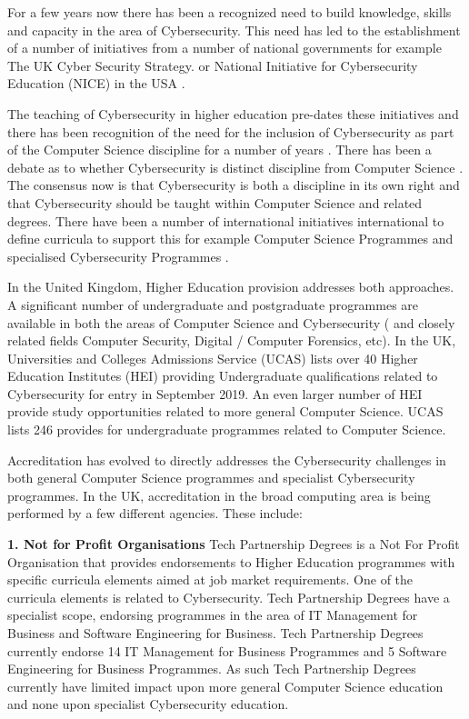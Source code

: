 \documentclass[sigconf]{acmart}
\begin{document}
For a few years now there has been a recognized need to build knowledge, skills and capacity in the area of Cybersecurity. This need has led to the establishment of a number of initiatives from a number of national governments for example The UK Cyber Security Strategy. \cite{UKCabinetOffice} or National Initiative for Cybersecurity Education (NICE) in the USA \cite{NICE}. 

The teaching of Cybersecurity in higher education pre-dates these initiatives and there has been recognition of the need for the inclusion of Cybersecurity as part of the Computer Science discipline for a number of years \cite{Hentea2006}. There has  been a debate as to whether Cybersecurity is distinct discipline from Computer Science \cite{McGettreick2013}. The consensus now is that Cybersecurity is both a discipline in its own right and that Cybersecurity should be taught within Computer Science and related degrees. There have been a number of international initiatives international to define curricula to support this for example Computer Science Programmes  \cite{ACM2013a} and specialised Cybersecurity Programmes \cite{ACMIEEEAISSIGSECIFIP}.

In the United Kingdom, Higher Education provision addresses both approaches. A significant number of undergraduate and postgraduate programmes are available in both the areas of Computer Science and Cybersecurity ( and closely related fields Computer Security, Digital / Computer Forensics, etc). In the UK, Universities and Colleges Admissions Service (UCAS) lists over 40 Higher Education Institutes (HEI) providing Undergraduate qualifications related to Cybersecurity for entry in September 2019. An even larger number of HEI provide study opportunities related to more general Computer Science. UCAS lists 246 provides for undergraduate programmes related to Computer Science. 

Accreditation has evolved to directly addresses the Cybersecurity challenges in both general Computer Science programmes and specialist Cybersecurity programmes. In the UK, accreditation in the broad computing area is being performed by a few different agencies. These include:

\textbf{1. Not for Profit Organisations}
Tech Partnership Degrees is a Not For Profit Organisation that provides endorsements to Higher Education programmes with specific curricula elements aimed at job market requirements. One of the curricula elements is related to Cybersecurity. Tech Partnership Degrees have a specialist scope, endorsing programmes in the area of IT Management for Business and Software Engineering for Business.  Tech Partnership Degrees currently endorse 14 IT Management for Business Programmes and 5 Software Engineering for Business Programmes. As such Tech Partnership Degrees currently have limited impact upon more general Computer Science education and none upon specialist Cybersecurity education. 
\end{document}
